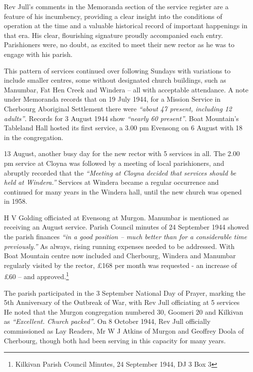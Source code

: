 Rev Jull's comments in the Memoranda section of the service register are a feature of his incumbency, providing a clear insight into the conditions of operation at the time and a valuable historical record of important happenings in that era. His clear, flourishing signature proudly accompanied each entry. Parishioners were, no doubt, as excited to meet their new rector as he was to engage with his parish.

This pattern of services continued over following Sundays with variations to include smaller centres, some without designated church buildings, such as Manumbar, Fat Hen Creek and Windera -- all with acceptable attendance. A note under Memoranda records that on 19 July 1944, for a Mission Service in Cherbourg Aboriginal Settlement there were \emph{``about 47 present, including 12 adults''}. Records for 3 August 1944 show \emph{``nearly 60 present''}. Boat Mountain's Tableland Hall hosted its first service, a 3.00 pm Evensong on 6 August with 18 in the congregation.

13 August, another busy day for the new rector with 5 services in all. The 2.00 pm service at Cloyna was followed by a meeting of local parishioners, and abruptly recorded that the \emph{``Meeting at Cloyna decided that services should be held at Windera.''} Services at Windera became a regular occurrence and continued for many years in the Windera hall, until the new church was opened in 1958.

H V Golding officiated at Evensong at Murgon. Manumbar is mentioned as receiving an August service. Parish Council minutes of 24 September 1944 showed the parish finances \emph{``in a good position -- much better than for a considerable time previously.''} As always, rising running expenses needed to be addressed. With Boat Mountain centre now included and Cherbourg, Windera and Manumbar regularly visited by the rector, £168 per month was requested - an increase of £60 -- and approved.\footnote{Kilkivan Parish Council Minutes, 24 September 1944, DJ 3 Box 3}

The parish participated in the 3 September National Day of Prayer, marking the 5th Anniversary of the Outbreak of War, with Rev Jull officiating at 5 services He noted that the Murgon congregation numbered 30, Goomeri 20 and Kilkivan as \emph{``Excellent. Church packed''}. On 8 October 1944, Rev Jull officially commissioned as Lay Readers, Mr W J Atkins of Murgon and Geoffrey Doola of Cherbourg, though both had been serving in this capacity for many years.


